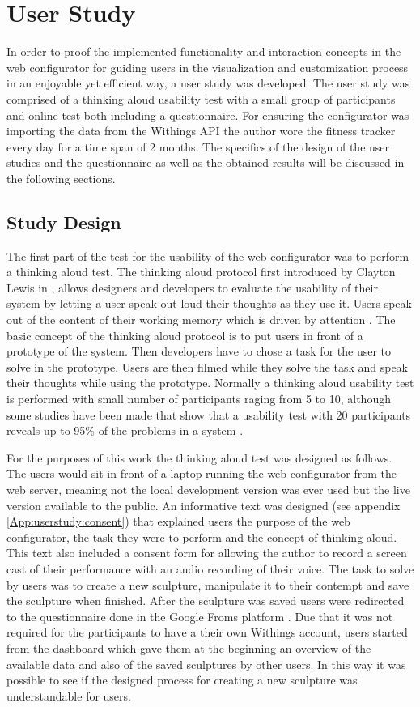 \documentclass[../medieninformatik-arbeit.tex]{subfiles}
\begin{document}
\section{User Study}
\label{ch:study}
In order to proof the implemented functionality and interaction concepts in the web configurator for guiding users in the visualization and customization process in an enjoyable yet efficient way, a user study was developed. The user study was comprised of a thinking aloud usability test with a small group of participants and online test both including a questionnaire. For ensuring the configurator was importing the data from the Withings API the author wore the fitness tracker every day for a time span of 2 months. The specifics of the design of the user studies and the questionnaire as well as the obtained results will be discussed in the following sections. 

\subsection{Study Design}
The first part of the test for the usability of the web configurator was to perform a thinking aloud test. The thinking aloud protocol first introduced by Clayton Lewis in \cite{lewis1982using}, allows designers and developers to evaluate the usability of their system by letting a user speak out loud their thoughts as they use it. Users speak out of the content of their working memory which is driven by attention \cite{lewis1993task}. The basic concept of the thinking aloud protocol is to put users in front of a prototype of the system. Then developers have to chose a task for the user to solve in the prototype. Users are then filmed while they solve the task and speak their thoughts while using the prototype. Normally a thinking aloud usability test is performed with small number of participants raging from 5 to 10, although some studies have been made that show that a usability test with 20 participants reveals up to 95\% of the problems in a system \cite{vande2008beyond}. 

For the purposes of this work the thinking aloud test was designed as follows. The users would sit in front of a laptop running the web configurator from the web server, meaning not the local development version was ever used but the live version available to the public. An informative text was designed (see appendix \ref{App:userstudy:consent}) that explained users the purpose of the web configurator, the task they were to perform and the concept of thinking aloud. This text also included a consent form for allowing the author to record a screen cast of their performance with an audio recording of their voice. The task to solve by users was to create a new sculpture, manipulate it to their contempt and save the sculpture when finished. After the sculpture was saved users were redirected to the questionnaire done in the Google Froms platform \cite{googleforms}. Due that it was not required for the participants to have a their own Withings account, users started from the dashboard which gave them at the beginning an overview of the available data and also of the saved sculptures by other users. In this way it was possible to see if the designed process for creating a new sculpture was understandable for users. 
\end{document}
